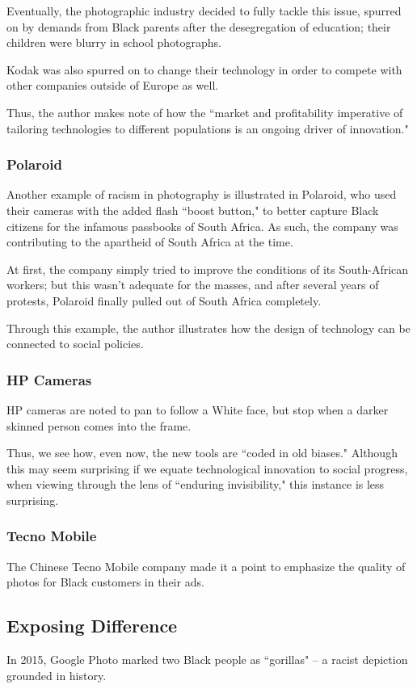 \documentclass[openany]{book}
\begin{document}
Eventually, the photographic industry decided to fully tackle this issue, spurred on by demands from Black parents after the desegregation of education; their children were blurry in school photographs.

Kodak was also spurred on to change their technology in order to compete with other companies outside of Europe as well.

Thus, the author makes note of how the ``market and profitability imperative of tailoring technologies to different populations is an ongoing driver of innovation."

\subsubsection{Polaroid}
Another example of racism in photography is illustrated in Polaroid, who used their cameras with the added flash ``boost button," to better capture Black citizens for the infamous passbooks of South Africa. As such, the company was contributing to the apartheid of South Africa at the time.

At first, the company simply tried to improve the conditions of its South-African workers; but this wasn't adequate for the masses, and after several years of protests, Polaroid finally pulled out of South Africa completely.

Through this example, the author illustrates how the design of technology can be connected to social policies.

\subsubsection{HP Cameras}
HP cameras are noted to pan to follow a White face, but stop when a darker skinned person comes into the frame.

Thus, we see how, even now, the new tools are ``coded in old biases." Although this may seem surprising if we equate technological innovation to social progress, when viewing through the lens of ``enduring invisibility," this instance is less surprising.

\subsubsection{Tecno Mobile}
The Chinese Tecno Mobile company made it a point to emphasize the quality of photos for Black customers in their ads.

\subsection{Exposing Difference}
In 2015, Google Photo marked two Black people as ``gorillas" -- a racist depiction grounded in history.
\end{document}
